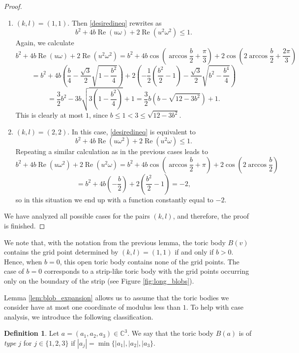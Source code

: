 \documentclass[12pt, a4paper]{article}
\theoremstyle{plain} %
\theoremstyle{definition} %
\newtheorem{definition}[theorem]{Definition}
\theoremstyle{remark} %
\DeclareMathOperator{\re}{Re}
\begin{document}
\begin{proof}
\begin{enumerate}
\item $(k, l)=(1, 1)$. Then \eqref{desiredineq} rewrites as
$$b^2 + 4b\re(u\omega) + 2 \re(u^2 \omega^2) \leq 1.$$
Again, we calculate
$$b^2 + 4b\re(u\omega) + 2 \re(u^2 \omega^2) = b^2 + 4b \cos \left ( \arccos{\frac{b}{2}} + \frac{\pi}{3}  \right ) + 2 \cos \left ( 2\arccos{\frac{b}{2}} + \frac{2\pi}{3}  \right )$$
$$=b^2 + 4b \left ( \frac{b}{4} - \frac{\sqrt{3}}{2} \sqrt{1 - \frac{b^2}{4}} \right ) + 2 \left ( - \frac{1}{2}  \left ( \frac{b^2}{2} - 1 \right )  -  \frac{\sqrt{3}}{2} \sqrt{b^2 - \frac{b^4}{4}} \right )$$
$$= \frac{3}{2}b^2 - 3b\sqrt{3\left ( 1 - \frac{b^2}{4} \right )} + 1 = \frac{3}{2} b \left ( b - \sqrt{12-3b^2} \right ) + 1.$$
This is clearly at most $1$, since $b \leq 1 < 3 \leq \sqrt{12-3b^2}$.
\item $(k, l)=(2, 2)$. In this case, \eqref{desiredineq} is equivalent to
$$b^2 + 4b\re(u\omega^2) + 2 \re(u^2 \omega) \leq 1.$$
Repeating a similar calculation as in the previous cases leads to
$$b^2 + 4b\re(u\omega^2) + 2 \re(u^2 \omega) = b^2 + 4b\cos \left ( \arccos{\frac{b}{2}} + \pi  \right ) + 2 \cos \left ( 2\arccos{\frac{b}{2}} \right )$$
$$=b^2 + 4b \left ( -\frac{b}{2} \right ) + 2 \left ( \frac{b^2}{2}-1 \right )=-2,$$
so in this situation we end up with a function constantly equal to $-2$.

\end{enumerate}

We have analyzed all possible cases for the pairs $(k, l)$, and therefore, the proof is finished.
\end{proof}

We note that, with the notation from the previous lemma, the toric body $B(v)$ contains the grid point determined by $(k, l) = (1, 1)$ if and only if $b>0$. Hence, when $b=0$, this open toric body contains none of the grid points. The case of $b=0$ corresponds to a strip-like toric body with the grid points occurring only on the boundary of the strip (see Figure \ref{fig:long_blobs}).



Lemma \ref{lem:blob_expansion} allows us to assume that the toric bodies we consider have at most one coordinate of modulus less than $1$. To help with case analysis, we introduce the following classification.

\begin{definition}
    Let $a = (a_1, a_2, a_3) \in \mathbb{C}^3$. We say that the toric body $B(a)$ is of \emph{type $j$} for $j \in \{1, 2, 3\}$ if $|a_j| = \min \{|a_1|, |a_2|, |a_3 \}$.
\end{definition}
\end{document}
